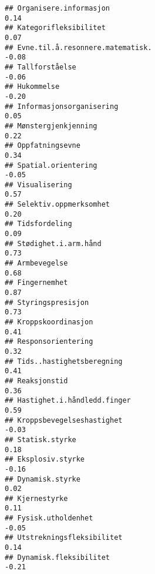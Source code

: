 \documentclass[
]{article}
\begin{document}
\begin{verbatim}
## Organisere.informasjon                                                            0.14
## Kategorifleksibilitet                                                             0.07
## Evne.til.å.resonnere.matematisk.                                                 -0.08
## Tallforståelse                                                                   -0.06
## Hukommelse                                                                       -0.20
## Informasjonsorganisering                                                          0.05
## Mønstergjenkjenning                                                               0.22
## Oppfatningsevne                                                                   0.34
## Spatial.orientering                                                              -0.05
## Visualisering                                                                     0.57
## Selektiv.oppmerksomhet                                                            0.20
## Tidsfordeling                                                                     0.09
## Stødighet.i.arm.hånd                                                              0.73
## Armbevegelse                                                                      0.68
## Fingernemhet                                                                      0.87
## Styringspresisjon                                                                 0.73
## Kroppskoordinasjon                                                                0.41
## Responsorientering                                                                0.32
## Tids..hastighetsberegning                                                         0.41
## Reaksjonstid                                                                      0.36
## Hastighet.i.håndledd.finger                                                       0.59
## Kroppsbevegelseshastighet                                                        -0.03
## Statisk.styrke                                                                    0.18
## Eksplosiv.styrke                                                                 -0.16
## Dynamisk.styrke                                                                   0.02
## Kjernestyrke                                                                      0.11
## Fysisk.utholdenhet                                                               -0.05
## Utstrekningsfleksibilitet                                                         0.14
## Dynamisk.fleksibilitet                                                           -0.21

\end{verbatim}
\end{document}
